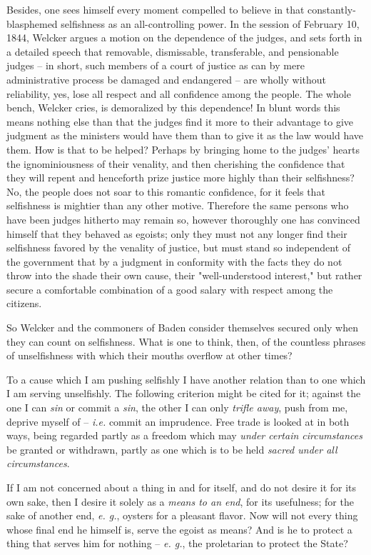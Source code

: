 \documentclass[a4paper]{book}
\begin{document}
Besides, one sees himself every moment compelled to believe in that 
constantly-blasphemed selfishness as an all-controlling power. In the session 
of February 10, 1844, Welcker argues a motion on the dependence of the judges, 
and sets forth in a detailed speech that removable, dismissable, transferable, 
and pensionable judges -- in short, such members of a court of justice as can 
by mere administrative process be damaged and endangered -- are wholly without 
reliability, yes, lose all respect and all confidence among the people. The 
whole bench, Welcker cries, is demoralized by this dependence! In blunt words 
this means nothing else than that the judges find it more to their advantage 
to give judgment as the ministers would have them than to give it as the law 
would have them. How is that to be helped? Perhaps by bringing home to the 
judges' hearts the ignominiousness of their venality, and then cherishing the 
confidence that they will repent and henceforth prize justice more highly than 
their selfishness? No, the people does not soar to this romantic confidence, 
for it feels that selfishness is mightier than any other motive. Therefore the 
same persons who have been judges hitherto may remain so, however thoroughly 
one has convinced himself that they behaved as egoists; only they must not any 
longer find their selfishness favored by the venality of justice, but must 
stand so independent of the government that by a judgment in conformity with 
the facts they do not throw into the shade their own cause, their 
"{}well-understood interest,"{} but rather secure a comfortable combination of 
a good salary with respect among the citizens.

So Welcker and the commoners of Baden consider themselves secured only when 
they can count on selfishness. What is one to think, then, of the countless 
phrases of unselfishness with which their mouths overflow at other times?

To a cause which I am pushing selfishly I have another relation than to one 
which I am serving unselfishly. The following criterion might be cited for it; 
against the one I can \textit{sin} or commit a \textit{sin}, the other I can 
only \textit{trifle away}, push from me, deprive myself of -- \textit{i.e.} 
commit an imprudence. Free trade is looked at in both ways, being regarded 
partly as a freedom which may \textit{under certain circumstances} be granted 
or withdrawn, partly as one which is to be held \textit{sacred under all 
circumstances}.

If I am not concerned about a thing in and for itself, and do not desire it 
for its own sake, then I desire it solely as a \textit{means to an end}, for 
its usefulness; for the sake of another end, \textit{e. g.}, oysters for a 
pleasant flavor. Now will not every thing whose final end he himself is, serve 
the egoist as means? And is he to protect a thing that serves him for nothing 
-- \textit{e. g.}, the proletarian to protect the State?
\end{document}
